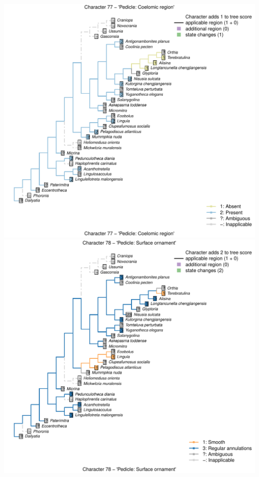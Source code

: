 \documentclass[]{book}
\theoremstyle{definition}
\theoremstyle{definition}
\theoremstyle{definition}
\theoremstyle{remark}
\begin{document}
\includegraphics{Brachiopod_phylogeny_files/figure-latex/unnamed-chunk-4-77.pdf}
\includegraphics{Brachiopod_phylogeny_files/figure-latex/unnamed-chunk-4-78.pdf}
\end{document}
